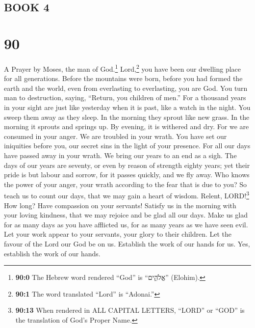 \hypertarget{book-4}{%
\subsection{BOOK 4}\label{book-4}}

\hypertarget{section-82}{%
\section{90}\label{section-82}}

A Prayer by Moses, the man of God.\footnote{\textbf{90:0} The Hebrew
  word rendered ``God'' is ``אֱלֹהִ֑ים'' (Elohim).} 
Lord,\footnote{\textbf{90:1} The word translated ``Lord'' is ``Adonai.''}
you have been our dwelling place for all generations. 
Before the mountains were born, before you had formed the earth and the
world, even from everlasting to everlasting, you are God. 
You turn man to destruction, saying, ``Return, you children of men.''
 For a thousand years in your sight are just like
yesterday when it is past, like a watch in the night.  You
sweep them away as they sleep. In the morning they sprout like new
grass.  In the morning it sprouts and springs up. By
evening, it is withered and dry.  For we are consumed in
your anger. We are troubled in your wrath.  You have set
our iniquities before you, our secret sins in the light of your
presence.  For all our days have passed away in your
wrath. We bring our years to an end as a sigh.  The days
of our years are seventy, or even by reason of strength eighty years;
yet their pride is but labour and sorrow, for it passes quickly, and we
fly away.  Who knows the power of your anger, your wrath
according to the fear that is due to you?  So teach us to
count our days, that we may gain a heart of wisdom. 
Relent, LORD!\footnote{\textbf{90:13} When rendered in ALL CAPITAL
  LETTERS, ``LORD'' or ``GOD'' is the translation of God's Proper Name.}
How long? Have compassion on your servants!  Satisfy us
in the morning with your loving kindness, that we may rejoice and be
glad all our days.  Make us glad for as many days as you
have afflicted us, for as many years as we have seen evil.
 Let your work appear to your servants, your glory to
their children.  Let the favour of the Lord our God be on
us. Establish the work of our hands for us. Yes, establish the work of
our hands.


